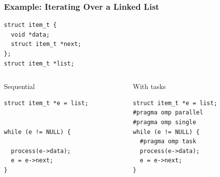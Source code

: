 \documentclass{beamer}
\begin{document}
\begin{frame}[fragile=singleslide]
  \frametitle{Example: Iterating Over a Linked List}

\begin{verbatim}
struct item_t {
  void *data;
  struct item_t *next;
};
struct item_t *list;
\end{verbatim}

\begin{columns}[T]
  \begin{column}{0.49\textwidth}
    \begin{block}{Sequential}
\begin{verbatim}
struct item_t *e = list;


while (e != NULL) {

  process(e->data);
  e = e->next;
}
\end{verbatim}
    \end{block}
  \end{column}

  \begin{column}{0.49\textwidth}
    \begin{block}{With tasks\phantom{Sq}}
\begin{verbatim}
struct item_t *e = list;
#pragma omp parallel
#pragma omp single
while (e != NULL) {
  #pragma omp task
  process(e->data);
  e = e->next;
}
\end{verbatim}
    \end{block}
  \end{column}
\end{columns}
\end{frame}

\end{document}
